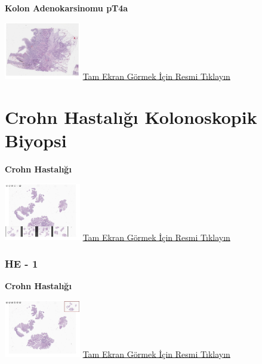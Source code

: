 \documentclass[
  letterpaper,
  DIV=11,
  numbers=noendperiod]{scrreprt}
\begin{document}
\textbf{Kolon Adenokarsinomu pT4a}

\href{https://images.patolojiatlasi.com/colon-adenocarcinoma/HE3.html}{\includegraphics[width=0.25\textwidth,height=\textheight]{./screenshots/thumbnail_colon-adenocarcinoma-3.png}}
\href{https://images.patolojiatlasi.com/colon-adenocarcinoma/HE3.html}{Tam
Ekran Görmek İçin Resmi Tıklayın}

\hypertarget{sec-crohn-colonoscopic-biopsy}{%
\chapter{Crohn Hastalığı Kolonoskopik
Biyopsi}\label{sec-crohn-colonoscopic-biopsy}}

\textbf{Crohn Hastalığı}

\href{https://images.patolojiatlasi.com/crohn-colonoscopic-biopsy/all.html}{\includegraphics[width=0.25\textwidth,height=\textheight]{./screenshots/thumbnail_crohn-colonoscopic-biopsy-all.png}}
\href{https://images.patolojiatlasi.com/crohn-colonoscopic-biopsy/all.html}{Tam
Ekran Görmek İçin Resmi Tıklayın}

\hypertarget{he---1}{%
\subsection{HE - 1}\label{he---1}}

\textbf{Crohn Hastalığı}

\href{https://images.patolojiatlasi.com/crohn-colonoscopic-biopsy/HE1.html}{\includegraphics[width=0.25\textwidth,height=\textheight]{./screenshots/thumbnail_crohn-colonoscopic-biopsy-HE1.png}}
\href{https://images.patolojiatlasi.com/crohn-colonoscopic-biopsy/HE1.html}{Tam
Ekran Görmek İçin Resmi Tıklayın}
\end{document}
